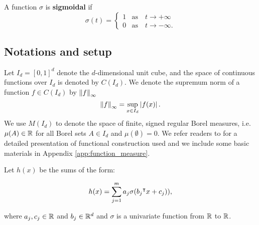 

\begin{definition}\label{def:sigmoidal}
    A function $\sigma$ is \textbf{sigmoidal} if
    \begin{equation}
        \sigma(t) =
        \begin{cases}
            1 & \text{as} \quad t \to +\infty \\
            0 & \text{as} \quad t \to -\infty.
        \end{cases}
    \end{equation}
\end{definition}

\subsection*{Notations and setup}

Let $I_d = [0,1]^d$ denote the $d$-dimensional unit cube, and the space of
continuous functions over $I_d$ is denoted by $C(I_d)$. We denote the supremum
norm of a function $f \in C(I_d)$ by $\left\| f \right\|_{\infty}$ 
\begin{equation}
    \label{def:sup_norm}
    \left\| f \right\|_{\infty} = \sup_{x\in I_d} \left| f(x) \right|.
\end{equation}
We use $M(I_d)$ to denote the space of finite, signed regular Borel measures,
i.e. $\mu(A) \in \mathbb{R}$ for all Borel sets $A \in I_d$ and $\mu(\emptyset)= 0$. We
refer readers to \cite{rudinFunctionalAnalysis1991,
rudinRealComplexAnalysis1987} for a detailed presentation of functional
construction used and we include some basic materials in Appendix
\ref{app:function_measure}.

Let $h(x)$ be the sums of the form:

\begin{equation}
    \label{eq:sum_sigma}
    h(x) = \sum_{j=1}^m a_j \sigma(b_j{}^{\intercal} x + c_j)),
\end{equation}

where $a_j, c_j \in \mathbb{R}$ and $b_j \in \mathbb{R}^d$ and $\sigma$ is a univariate function
from $\mathbb{R}$ to $\mathbb{R}$.
 
